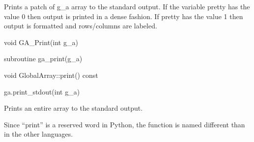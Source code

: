\documentclass[10pt]{article}
\begin{document}
\gcoll

\begin{desc}

Prints a patch of g_a array to the standard output. If the variable pretty has
the value 0 then output is printed in a dense fashion. If pretty has the value
1 then output is formatted and rows/columns are labeled.

\end{desc}


\begin{capi}
\begin{ccode}
void GA_Print(int g_a)
\end{ccode}
\begin{funcargs}
\end{funcargs}
\end{capi}

\begin{fapi}
\begin{fcode}
subroutine ga_print(g_a)
\end{fcode}
\begin{funcargs}
\end{funcargs}
\end{fapi}

\begin{cxxapi}
\begin{cxxcode}
void GlobalArray::print() const
\end{cxxcode}
\end{cxxapi}

\begin{pyapi}
\begin{pycode}
ga.print_stdout(int g_a)
\end{pycode}
\begin{funcargs}
\end{funcargs}
\end{pyapi}

\gcoll

\begin{desc}

Prints an entire array to the standard output.

\end{desc}

\begin{pydesc}

Since ``print'' is a reserved word in Python, the function is named different
than in the other languages.

\end{pydesc}
\end{document}
